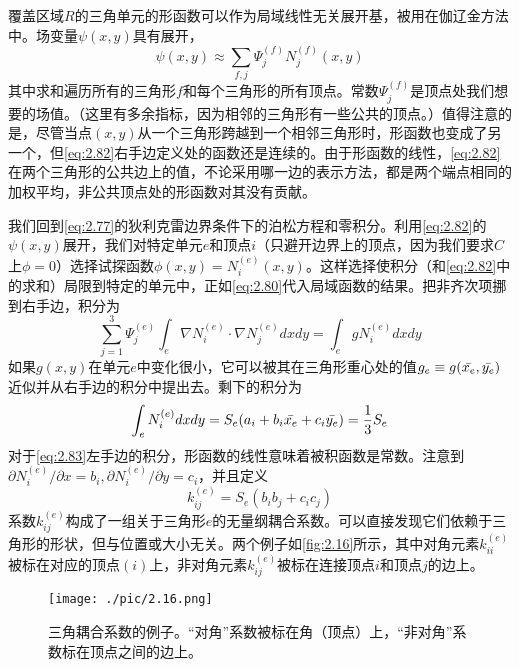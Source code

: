 \documentclass[12pt]{book}
\numberwithin{equation}{chapter}
\numberwithin{figure}{chapter}
\numberwithin{footnote}{page}
\begin{document}
覆盖区域$R$的三角单元的形函数可以作为局域线性无关展开基，被用在伽辽金方法中。场变量$\psi(x,y)$具有展开，
\begin{equation}\label{eq:2.82}
    \psi(x,y)\approx\sum_{f,j}\Psi_j^{(f)}N_j^{(f)}(x,y)
\end{equation}
其中求和遍历所有的三角形$f$和每个三角形的所有顶点。常数$\Psi_j^{(f)}$是顶点处我们想要的场值。（这里有多余指标，因为相邻的三角形有一些公共的顶点。）值得注意的是，尽管当点$(x,y)$从一个三角形跨越到一个相邻三角形时，形函数也变成了另一个，但\autoref{eq:2.82}右手边定义处的函数还是连续的。由于形函数的线性，\autoref{eq:2.82}在两个三角形的公共边上的值，不论采用哪一边的表示方法，都是两个端点相同的加权平均，非公共顶点处的形函数对其没有贡献。

我们回到\autoref{eq:2.77}的狄利克雷边界条件下的泊松方程和零积分。利用\autoref{eq:2.82}的$\psi(x,y)$展开，我们对特定单元$e$和顶点$i$（只避开边界上的顶点，因为我们要求$C$上$\phi=0$）选择试探函数$\phi(x,y)=N_i^{(e)}(x,y)$。这样选择使积分（和\autoref{eq:2.82}中的求和）局限到特定的单元中，正如\autoref{eq:2.80}代入局域函数的结果。把非齐次项挪到右手边，积分为
\begin{equation}\label{eq:2.83}
    \sum_{j=1}^3 \Psi_j^{(e)}\int_e \nabla N_i^{(e)}\cdot\nabla N_j^{(e)} dxdy=\int_e gN_i^{(e)}dxdy
\end{equation}
如果$g(x,y)$在单元$e$中变化很小，它可以被其在三角形重心处的值$g_e\equiv g(\Bar{x_e},\Bar{y_e})$近似并从右手边的积分中提出去。剩下的积分为
\begin{equation}\label{eq:2.84}
    \int_e N_i^{(e)}dxdy=S_e(a_i+b_i\Bar{x_e}+c_i\Bar{y_e})=\frac{1}{3}S_e
\end{equation}
对于\autoref{eq:2.83}左手边的积分，形函数的线性意味着被积函数是常数。注意到$\partial N_i^{(e)}/\partial x=b_i, \partial N_i^{(e)}/\partial y=c_i$，并且定义
\begin{equation}\label{eq:2.85}
    k_{ij}^{(e)}=S_e(b_ib_j+c_ic_j)
\end{equation}
系数$k_{ij}^{(e)}$构成了一组关于三角形$e$的无量纲耦合系数。可以直接发现它们依赖于三角形的形状，但与位置或大小无关。两个例子如\autoref{fig:2.16}所示，其中对角元素$k_{ii}^{(e)}$被标在对应的顶点$(i)$上，非对角元素$k_{ij}^{(e)}$被标在连接顶点$i$和顶点$j$的边上。

\begin{figure}[!ht]
    \centering
    \texttt{[image: ./pic/2.16.png]}
    \captionsetup{justification=raggedright, singlelinecheck=false}
    \caption{三角耦合系数的例子。“对角”系数被标在角（顶点）上，“非对角”系数标在顶点之间的边上。}
    \label{fig:2.16}
\end{figure}
\end{document}
